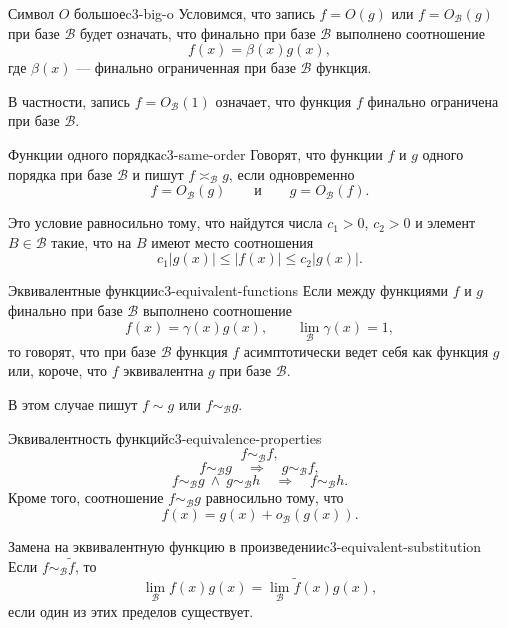 \begin{definition}{Символ $O$ большое}{c3-big-o}
  Условимся, что запись $f=O(g)$ или $f=O_{\mathcal B}(g)$ при базе
  $\mathcal B$ будет означать, что финально при базе $\mathcal B$ выполнено
  соотношение
  \[
    f(x)=\beta(x)g(x),
  \]
  где $\beta(x)$ — финально ограниченная при базе $\mathcal B$ функция.

  В частности, запись $f=O_{\mathcal B}(1)$ означает, что функция $f$
  финально ограничена при базе $\mathcal B$.
\end{definition}

\begin{definition}{Функции одного порядка}{c3-same-order}
  Говорят, что функции $f$ и $g$ одного порядка при базе $\mathcal B$ и
  пишут $f\asymp_{\mathcal B}g$, если одновременно
  \[
    f=O_{\mathcal B}(g)
    \qquad\text{и}\qquad
    g=O_{\mathcal B}(f).
  \]

  Это условие равносильно тому, что найдутся числа $c_1>0$, $c_2>0$ и
  элемент $B\in\mathcal B$ такие, что на $B$ имеют место соотношения
  \[
    c_1|g(x)|\le |f(x)|\le c_2|g(x)|.
  \]
\end{definition}

\begin{definition}{Эквивалентные функции}{c3-equivalent-functions}
  Если между функциями $f$ и $g$ финально при базе $\mathcal B$ выполнено
  соотношение
  \[
    f(x)=\gamma(x)g(x),
    \qquad
    \lim_{\mathcal B}\gamma(x)=1,
  \]
  то говорят, что при базе $\mathcal B$ функция $f$ асимптотически ведет
  себя как функция $g$ или, короче, что $f$ эквивалентна $g$ при базе
  $\mathcal B$.

  В этом случае пишут $f\sim g$ или $f\sim_{\mathcal B}g$.
\end{definition}

\begin{properties}{Эквивалентность функций}{c3-equivalence-properties}
  \[
    f\sim_{\mathcal B}f,
  \]
  \[
    f\sim_{\mathcal B}g\quad\Longrightarrow\quad g\sim_{\mathcal B}f,
  \]
  \[
    f\sim_{\mathcal B}g\ \land\ g\sim_{\mathcal B}h
    \quad\Longrightarrow\quad
    f\sim_{\mathcal B}h.
  \]
  Кроме того, соотношение $f\sim_{\mathcal B}g$ равносильно тому, что
  \[
    f(x)=g(x)+o_{\mathcal B}(g(x)).
  \]
\end{properties}

\begin{proposition}{Замена на эквивалентную функцию в произведении}{c3-equivalent-substitution}
  Если $f\sim_{\mathcal B}\widetilde f$, то
  \[
    \lim_{\mathcal B}f(x)g(x)
    =
    \lim_{\mathcal B}\widetilde f(x)g(x),
  \]
  если один из этих пределов существует.
\end{proposition}

